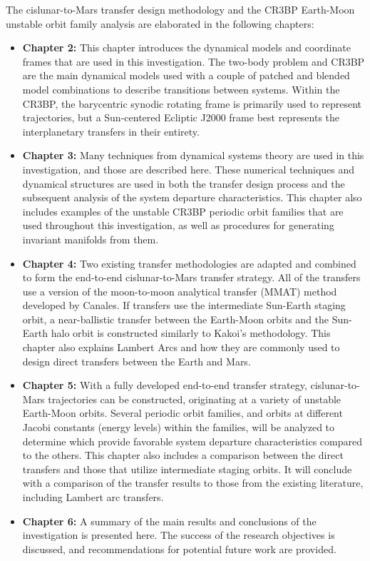 The cislunar-to-Mars transfer design methodology and the CR3BP Earth-Moon unstable orbit family
analysis are elaborated in the following chapters:
\begin{itemize}
	\item	\textbf{Chapter 2:} This chapter introduces the dynamical models and coordinate frames
			that are used in this investigation. The two-body problem and CR3BP are the main
			dynamical models used with a couple of patched and blended model combinations to
			describe transitions between systems. Within the CR3BP, the barycentric synodic
			rotating frame is primarily used to represent trajectories, but a Sun-centered Ecliptic
			J2000 frame best represents the interplanetary transfers in their entirety.
	\item	\textbf{Chapter 3:} Many techniques from dynamical systems theory are used in this
			investigation, and those are described here. These numerical techniques and dynamical
			structures are used in both the transfer design process and the subsequent analysis of
			the system departure characteristics. This chapter also includes examples of the
			unstable CR3BP periodic orbit families that are used throughout this investigation, as
			well as procedures for generating invariant manifolds from them.
	\item	\textbf{Chapter 4:} Two existing transfer methodologies are adapted and combined to
			form the end-to-end cislunar-to-Mars transfer strategy. All of the transfers use a version
			of the moon-to-moon analytical transfer (MMAT) method developed by
			Canales\cite{Canales:2021b}. If transfers use the intermediate Sun-Earth staging orbit,
			a near-ballistic transfer between the Earth-Moon orbits and the Sun-Earth halo orbit is
			constructed similarly to Kakoi's methodology\cite{Kakoi:2015}. This chapter also explains
			Lambert Arcs and how they are commonly used to design direct transfers between the
			Earth and Mars.
	\item	\textbf{Chapter 5:} With a fully developed end-to-end transfer strategy, cislunar-to-Mars
			trajectories can be constructed, originating at a variety of unstable Earth-Moon
			orbits. Several periodic orbit families, and orbits at different Jacobi constants
			(energy levels) within the families, will be analyzed to determine which provide
			favorable system departure characteristics compared to the others. This chapter also
			includes a comparison between the direct transfers and those that utilize intermediate
			staging orbits. It will conclude with a comparison of the transfer results to those
			from the existing literature, including Lambert arc transfers.
	\item	\textbf{Chapter 6:} A summary of the main results and conclusions of the investigation
			is presented here. The success of the research objectives is discussed, and
			recommendations for potential future work are provided.
\end{itemize}
